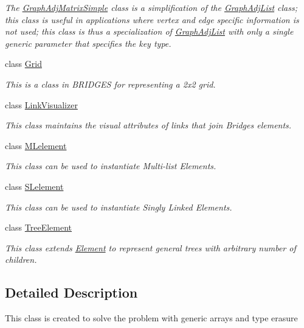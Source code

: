 \begin{DoxyCompactItemize}
\begin{DoxyCompactList}\small\item\em The \mbox{\hyperlink{classbridges_1_1base_1_1_graph_adj_matrix_simple}{Graph\+Adj\+Matrix\+Simple}} class is a simplification of the \mbox{\hyperlink{classbridges_1_1base_1_1_graph_adj_list}{Graph\+Adj\+List}} class; this class is useful in applications where vertex and edge specific information is not used; this class is thus a specialization of \mbox{\hyperlink{classbridges_1_1base_1_1_graph_adj_list}{Graph\+Adj\+List}} with only a single generic parameter that specifies the key type. \end{DoxyCompactList}\item 
class \mbox{\hyperlink{classbridges_1_1base_1_1_grid}{Grid}}
\begin{DoxyCompactList}\small\item\em This is a class in B\+R\+I\+D\+G\+ES for representing a 2x2 grid. \end{DoxyCompactList}\item 
class \mbox{\hyperlink{classbridges_1_1base_1_1_link_visualizer}{Link\+Visualizer}}
\begin{DoxyCompactList}\small\item\em This class maintains the visual attributes of links that join Bridges elements. \end{DoxyCompactList}\item 
class \mbox{\hyperlink{classbridges_1_1base_1_1_m_lelement}{M\+Lelement}}
\begin{DoxyCompactList}\small\item\em This class can be used to instantiate Multi-\/list Elements. \end{DoxyCompactList}\item 
class \mbox{\hyperlink{classbridges_1_1base_1_1_s_lelement}{S\+Lelement}}
\begin{DoxyCompactList}\small\item\em This class can be used to instantiate Singly Linked Elements. \end{DoxyCompactList}\item 
class \mbox{\hyperlink{classbridges_1_1base_1_1_tree_element}{Tree\+Element}}
\begin{DoxyCompactList}\small\item\em This class extends \mbox{\hyperlink{classbridges_1_1base_1_1_element}{Element}} to represent general trees with arbitrary number of children. \end{DoxyCompactList}\end{DoxyCompactItemize}


\subsection{Detailed Description}
This class is created to solve the problem with generic arrays and type erasure 